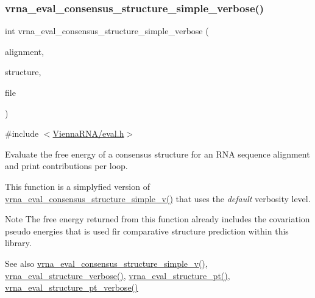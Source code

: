 \subsubsection{\texorpdfstring{vrna\+\_\+eval\+\_\+consensus\+\_\+structure\+\_\+simple\+\_\+verbose()}{vrna\_eval\_consensus\_structure\_simple\_verbose()}}
{\footnotesize\ttfamily int vrna\+\_\+eval\+\_\+consensus\+\_\+structure\+\_\+simple\+\_\+verbose (\begin{DoxyParamCaption}\item[{const char $\ast$$\ast$}]{alignment,  }\item[{const char $\ast$}]{structure,  }\item[{F\+I\+LE $\ast$}]{file }\end{DoxyParamCaption})}



{\ttfamily \#include $<$\hyperlink{eval_8h}{Vienna\+R\+N\+A/eval.\+h}$>$}



Evaluate the free energy of a consensus structure for an R\+NA sequence alignment and print contributions per loop. 

This function is a simplyfied version of \hyperlink{group__eval_gad88927c62ab0a8b534e078e44be1b36e}{vrna\+\_\+eval\+\_\+consensus\+\_\+structure\+\_\+simple\+\_\+v()} that uses the {\itshape default} verbosity level.

\begin{DoxyNote}{Note}
The free energy returned from this function already includes the covariation pseudo energies that is used fir comparative structure prediction within this library.
\end{DoxyNote}
\begin{DoxySeeAlso}{See also}
\hyperlink{group__eval_gad88927c62ab0a8b534e078e44be1b36e}{vrna\+\_\+eval\+\_\+consensus\+\_\+structure\+\_\+simple\+\_\+v()}, \hyperlink{group__eval_ga0928d699d310178f84ee2351034e5cb5}{vrna\+\_\+eval\+\_\+structure\+\_\+verbose()}, \hyperlink{group__eval_gadbd09372ddfd7a450bbd590c96a6bfe4}{vrna\+\_\+eval\+\_\+structure\+\_\+pt()}, \hyperlink{group__eval_ga8a517cfeeae8c376ae7b1e0c401d38b4}{vrna\+\_\+eval\+\_\+structure\+\_\+pt\+\_\+verbose()}
\end{DoxySeeAlso}

